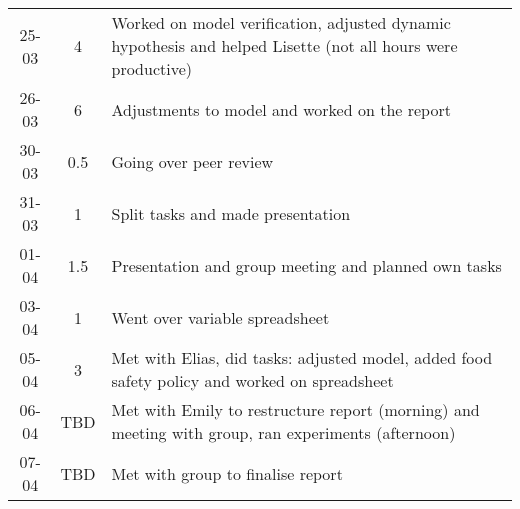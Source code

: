 \begin{longtable}[c]{c|c|m{35em}}
25-03 & 4 & Worked on model verification, adjusted dynamic hypothesis and helped Lisette (not all hours were productive) \\ 
26-03 & 6 & Adjustments to model and worked on the report \\ 
30-03 & 0.5 & Going over peer review \\
31-03 & 1 & Split tasks and made presentation \\
01-04 & 1.5 & Presentation and group meeting and planned own tasks \\ 
03-04 & 1 & Went over variable spreadsheet \\ 
05-04 & 3 & Met with Elias, did tasks: adjusted model, added food safety policy and worked on spreadsheet \\ 
06-04 & TBD & Met with Emily to restructure report (morning) and meeting with group, ran experiments (afternoon) \\
07-04 & TBD & Met with group to finalise report \\ 
\end{longtable}

